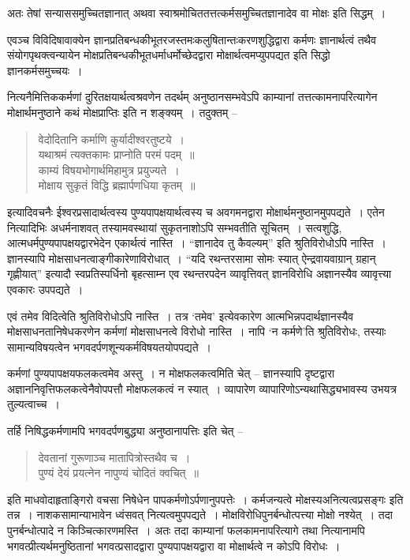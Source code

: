 {अतः तेषां सन्याससमुच्चितज्ञानात् अथवा स्वाश्रमोचिततत्तत्कर्मसमुच्चितज्ञानादेव वा मोक्षः इति सिद्धम्~। 

एवञ्च विविदिषावाक्येन ज्ञानप्रतिबन्धकीभूतरजस्तमःकलुषितान्तःकरणशुद्धिद्वारा कर्मणः ज्ञानार्थत्वं तथैव संयोगपृथक्त्वन्यायेन मोक्षप्रतिबन्धकीभूतधर्माधर्मोच्छेदद्वारा मोक्षार्थत्व\-मप्युपपद्यत इति सिद्धो ज्ञानकर्मसमुच्चयः~। 

नित्यनैमित्तिककर्मणां दुरितक्षयार्थत्वश्रवणेन तदर्थम् अनुष्ठानसम्भवेऽपि काम्यानां तत्तत्कामनापरित्यागेन मोक्षार्थमनुष्ठाने कथं मोक्षप्राप्तिः इति न शङ्क्यम्~। तदुक्तम् –
\begin{verse}
वेदोदितानि कर्माणि कुर्यादीश्वरतुष्टये~। \\
यथाश्रमं त्यक्तकामः प्राप्नोति परमं पदम्~॥\\
काम्यं विषयभोगार्थमिहामुत्र प्रयुज्यते~। \\
मोक्षाय सुकृतं विद्धि ब्रह्मार्पणधिया कृतम्~॥
\end{verse}
इत्यादिवचनैः ईश्वरप्रसादार्थत्वस्य पुण्यपापक्षयार्थत्वस्य च अवगमनद्वारा मोक्षार्थमनुष्ठानमुपपद्यते~। एतेन नित्यादिभिः अधर्मनाशवत् तस्यामवस्थायां सुकृतनाशोऽपि सम्भवतीति सूचितम्~। सत्वशुद्धि, आत्मधर्मपुण्यपापक्षयद्वारभेदेन एकार्थत्वं नास्ति~। “ज्ञानादेव तु कैवल्यम्” इति श्रुतिविरोधोऽपि नास्ति~। ज्ञानस्यापि मोक्षसाधनत्वाङ्गीकारेणाविरोधात्~। “यदि रथन्तरसामा सोमः स्यात् ऐन्द्रवायवाग्रान् ग्रहान् गृह्णीयात्” इत्यादौ स्वप्रतिस्पर्धिनो बृहत्साम्न एव रथन्तरपदेन व्यावृत्तिवत् ज्ञानविरोधि अज्ञानस्यैव व्यावृत्त्या एवकारः उपपद्यते~। 

एवं तमेव विदित्वेति श्रुतिविरोधोऽपि नास्ति~। तत्र ‘तमेव’ इत्येवकारेण आत्मभिन्न\-पदार्थज्ञानस्यैव मोक्षसाधनतानिषेधकरणेन कर्मणां मोक्षसाधनत्वे विरोधो नास्ति~। नापि ‘न कर्मणे’ति श्रुतिविरोधः, तस्याः सामान्यविषयत्वेन भगवदर्पणशून्यकर्मविषयतयोपपद्यते~। 

कर्मणां पुण्यपापक्षयफलकत्वमेव अस्तु~। न मोक्षफलकत्वमिति चेत् – ज्ञानस्यापि दृष्टद्वारा अज्ञाननिवृत्तिफलकत्वेनैवोपपत्तौ मोक्षफलकत्वं न स्यात्~। व्यापारेण व्यापारिणोऽन्यथासिद्ध्यभावस्य उभयत्र तुल्यत्वाच्च~। 

तर्हि निषिद्धकर्मणामपि भगवदर्पणबुद्ध्या अनुष्ठानापत्तिः इति चेत् –
\begin{verse}
देवतानां गुरूणाञ्च मातापित्रोस्तथैव च~। \\
पुण्यं देयं प्रयत्नेन नापुण्यं चोदितं क्वचित्~॥
\end{verse}
इति माधवोदाहृताङ्गिरो वचसा निषेधेन पापकर्मणोऽर्पणानुपपत्तेः~। कर्मजन्यत्वे मोक्षस्य\break अनित्यत्वप्रसङ्गः इति तन्न~। नाशकसामान्याभावेन ध्वंसवत् नित्यत्वमुपपद्यते~। मोक्षविरोधि\-पुनर्बन्धोत्पत्त्या मोक्षो नश्येत्~। तदा पुनर्बन्धोत्पादे न किञ्चित्कारणमस्ति~। अतः तदा काम्यानां फलकामनापरित्यागे तथा नित्यानामपि भगवत्प्रीत्यर्थमनुष्ठितानां भगवत्प्रसादद्वारा पुण्यपापक्षयद्वारा वा मोक्षार्थत्वे न कोऽपि विरोधः~। 

}
